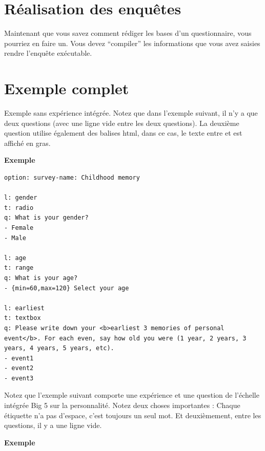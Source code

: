 \documentclass[
]{book}
\begin{document}
\hypertarget{s7-3}{%
\section{Réalisation des enquêtes}\label{s7-3}}

Maintenant que vous savez comment rédiger les bases d'un questionnaire,
vous pourriez en faire un. Vous devez ``compiler'' les informations que
vous avez saisies rendre l'enquête exécutable.

\hypertarget{s7-4}{%
\section{Exemple complet}\label{s7-4}}

Exemple sans expérience intégrée. Notez que dans l'exemple suivant, il
n'y a que deux questions (avec une ligne vide entre les deux questions).
La deuxième question utilise également des balises html, dans ce cas, le
texte entre et est affiché en gras.

\textbf{Exemple}

\begin{verbatim}
option: survey-name: Childhood memory

l: gender
t: radio
q: What is your gender?
- Female
- Male

l: age
t: range
q: What is your age?
- {min=60,max=120} Select your age

l: earliest
t: textbox
q: Please write down your <b>earliest 3 memories of personal event</b>. For each even, say how old you were (1 year, 2 years, 3 years, 4 years, 5 years, etc).
- event1
- event2
- event3
\end{verbatim}

Notez que l'exemple suivant comporte une expérience et une question de
l'échelle intégrée Big 5 sur la personnalité. Notez deux choses
importantes : Chaque étiquette n'a pas d'espace, c'est toujours un seul
mot. Et deuxièmement, entre les questions, il y a une ligne vide.

\textbf{Exemple}
\end{document}
